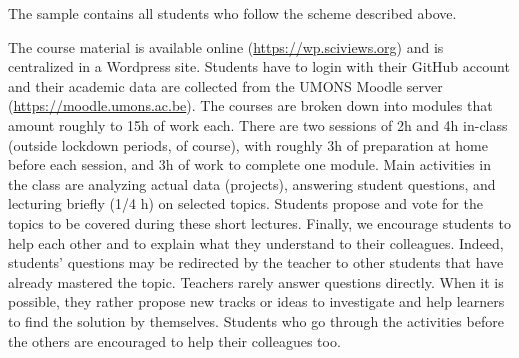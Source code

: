 \documentclass{aims}
\theoremstyle{definition}
\begin{document}
The sample contains all students who follow the scheme described above.

The course material is available online (\url{https://wp.sciviews.org})
and is centralized in a Wordpress site. Students have to login with
their GitHub account and their academic data are collected from the
UMONS Moodle server (\url{https://moodle.umons.ac.be}). The courses are
broken down into modules that amount roughly to 15h of work each. There
are two sessions of 2h and 4h in-class (outside lockdown periods, of
course), with roughly 3h of preparation at home before each session, and
3h of work to complete one module. Main activities in the class are
analyzing actual data (projects), answering student questions, and
lecturing briefly (1/4 h) on selected topics. Students propose and vote
for the topics to be covered during these short lectures. Finally, we
encourage students to help each other and to explain what they
understand to their colleagues. Indeed, students' questions may be
redirected by the teacher to other students that have already mastered
the topic. Teachers rarely answer questions directly. When it is
possible, they rather propose new tracks or ideas to investigate and
help learners to find the solution by themselves. Students who go
through the activities before the others are encouraged to help their
colleagues too.
\end{document}
